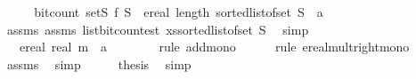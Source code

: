 \begin{isabellebody}
%
\isadelimproof
%
\endisadelimproof
%
\isatagproof
{}\isamarkupfalse%
\ {\isacharminus}{\kern0pt}\isanewline
\ \ \isamarkupfalse%
\ {\isachardoublequoteopen}bit{\isacharunderscore}{\kern0pt}count\ {\isacharparenleft}{\kern0pt}set\isactrlsub S\ f\ S{\isacharparenright}{\kern0pt}\ {\isasymle}\ ereal\ {\isacharparenleft}{\kern0pt}length\ {\isacharparenleft}{\kern0pt}sorted{\isacharunderscore}{\kern0pt}list{\isacharunderscore}{\kern0pt}of{\isacharunderscore}{\kern0pt}set\ S{\isacharparenright}{\kern0pt}{\isacharparenright}{\kern0pt}\ {\isacharasterisk}{\kern0pt}\ {\isacharparenleft}{\kern0pt}a{\isacharplus}{\kern0pt}{}{\isacharparenright}{\kern0pt}\ {\isacharplus}{\kern0pt}\ {}{\isachardoublequoteclose}\isanewline
\ \ \ \ \isamarkupfalse%
\ assms{\isacharparenleft}{\kern0pt}{}{\isacharparenright}{\kern0pt}\ assms{\isacharparenleft}{\kern0pt}{}{\isacharparenright}{\kern0pt}\ list{\isacharunderscore}{\kern0pt}bit{\isacharunderscore}{\kern0pt}count{\isacharunderscore}{\kern0pt}est{\isacharbrackleft}{\kern0pt}\ xs{\isacharequal}{\kern0pt}{\isachardoublequoteopen}sorted{\isacharunderscore}{\kern0pt}list{\isacharunderscore}{\kern0pt}of{\isacharunderscore}{\kern0pt}set\ S{\isachardoublequoteclose}{\isacharbrackright}{\kern0pt}\ \isamarkupfalse%
\ simp\isanewline
\ \ \isamarkupfalse%
\ \isamarkupfalse%
\ {\isachardoublequoteopen}{\isachardot}{\kern0pt}{\isachardot}{\kern0pt}{\isachardot}{\kern0pt}\ {\isasymle}\ ereal\ {\isacharparenleft}{\kern0pt}real\ m{\isacharparenright}{\kern0pt}\ {\isacharasterisk}{\kern0pt}\ {\isacharparenleft}{\kern0pt}a{\isacharplus}{\kern0pt}{}{\isacharparenright}{\kern0pt}\ {\isacharplus}{\kern0pt}\ {}{\isachardoublequoteclose}\isanewline
\ \ \ \ \isamarkupfalse%
\ {\isacharparenleft}{\kern0pt}rule\ add{\isacharunderscore}{\kern0pt}mono{\isacharparenright}{\kern0pt}\isanewline
\ \ \ \ \isamarkupfalse%
\ {\isacharparenleft}{\kern0pt}rule\ ereal{\isacharunderscore}{\kern0pt}mult{\isacharunderscore}{\kern0pt}right{\isacharunderscore}{\kern0pt}mono{\isacharparenright}{\kern0pt}\isanewline
\ \ \ \ \isamarkupfalse%
\ assms\ \isamarkupfalse%
\ simp{\isacharplus}{\kern0pt}\isanewline
\ \ \isamarkupfalse%
\ \isamarkupfalse%
\ {\isacharquery}{\kern0pt}thesis\ \isamarkupfalse%
\ simp\isanewline
{}\isamarkupfalse%
%
\endisatagproof
{\isafoldproof}%
%
\isadelimproof
\isanewline
%
\endisadelimproof
%
\isadelimtheory
\isanewline
%
\endisadelimtheory
%
\isatagtheory
{}\isamarkupfalse%
%
\endisatagtheory
{\isafoldtheory}%
%
\isadelimtheory
%
\endisadelimtheory
%
\end{isabellebody}%
